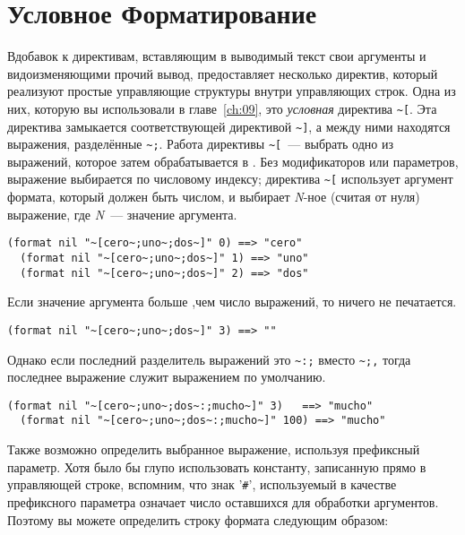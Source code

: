\section{Условное Форматирование}

Вдобавок к директивам, вставляющим в выводимый текст свои аргументы и видоизменяющими
прочий вывод,  предоставляет несколько директив, который реализуют простые
управляющие структуры внутри управляющих строк. Одна из них, которую вы использовали в
главе~\ref{ch:09}, это \textit{условная} директива \lstinline!~[!. Эта директива
замыкается соответствующей директивой \lstinline!~]!, а между ними находятся выражения,
разделённые \lstinline!~;!. Работа директивы \lstinline!~[!~--- выбрать одно из выражений,
которое затем обрабатывается в . Без модификаторов или параметров, выражение
выбирается по числовому индексу; директива \lstinline!~[! использует аргумент формата,
который должен быть числом, и выбирает \textit{N}-ное (считая от нуля) выражение, где
\textit{N}~--- значение аргумента.

\begin{lstlisting}[style=lisprepl]
  (format nil "~[cero~;uno~;dos~]" 0) ==> "cero"
  (format nil "~[cero~;uno~;dos~]" 1) ==> "uno"
  (format nil "~[cero~;uno~;dos~]" 2) ==> "dos"
\end{lstlisting}

Если значение аргумента больше ,чем число выражений, то ничего не печатается.

\begin{lstlisting}[style=lisprepl]
  (format nil "~[cero~;uno~;dos~]" 3) ==> ""
\end{lstlisting}

Однако если последний разделитель выражений это \lstinline!~:;! вместо \lstinline!~;,!
тогда последнее выражение служит выражением по умолчанию.

\begin{lstlisting}[style=lisprepl]
  (format nil "~[cero~;uno~;dos~:;mucho~]" 3)   ==> "mucho"
  (format nil "~[cero~;uno~;dos~:;mucho~]" 100) ==> "mucho"
\end{lstlisting}

Также возможно определить выбранное выражение, используя префиксный параметр. Хотя было бы
глупо использовать константу, записанную прямо в управляющей строке, вспомним, что знак
'\lstinline!#!', используемый в качестве префиксного параметра означает число оставшихся
для обработки аргументов. Поэтому вы можете определить строку формата следующим образом:

